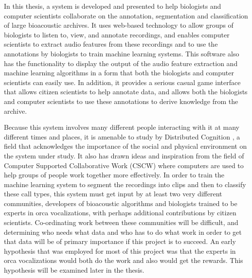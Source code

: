 \documentclass[12pt,oneside]{book}
\begin{document}
In this thesis, a system is developed and presented to help biologists
and computer scientists collaborate on the annotation, segmentation
and classification of large bioacoustic archives.  It uses web-based
technology to allow groups of biologists to listen to, view, and
annotate recordings, and enables computer scientists to extract audio
features from these recordings and to use the annotations by
biologists to train machine learning systems.  This software also has
the functionality to display the output of the audio feature
extraction and machine learning algorithms in a form that both the
biologists and computer scientists can easily use.  In addition, it
provides a serious casual game interface that allows citizen
scientists to help annotate data, and allows both the biologists and
computer scientists to use these annotations to derive knowledge from
the archive.

Because this system involves many different people interacting with it
at many different times and places, it is amenable to study by
Distributed Cognition \cite{hutchins1996cognition}, a field that
acknowledges the importance of the social and physical environment on
the system under study.  It also has drawn ideas and inspiration from
the field of Computer Supported Collaborative Work (CSCW)
\cite{bannon1991cscw} where computers are used to help groups of
people work together more effectively.  In order to train the machine
learning system to segment the recordings into clips and then to
classify these call types, this system must get input by at least two very
different communities, developers of bioacoustic algorithms and
biologists trained to be experts in orca vocalizations, with perhaps
additional contributions by citizen scientists.  Co-ordinating work
between these communities will be difficult, and determining who needs
what data and who has to do what work in order to get that
data\cite{grudin1988cscw} will be of primary importance if this
project is to succeed.  An early hypothesis that was employed for most
of this project was that the experts in orca vocalizations would both
do the work and also would get the rewards.  This hypothesis will be
examined later in the thesis.
\end{document}
